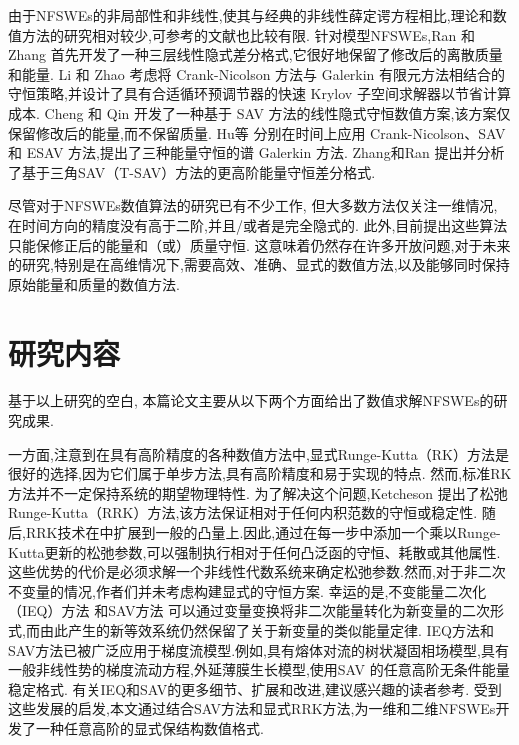 由于NFSWEs的非局部性和非线性,使其与经典的非线性薛定谔方程相比,理论和数值方法的研究相对较少,可参考的文献也比较有限.
针对模型NFSWEs,Ran 和 Zhang \cite{ranLinearlyImplicitConservative2016} 首先开发了一种三层线性隐式差分格式,它很好地保留了修改后的离散质量和能量. 
Li 和 Zhao \cite{liFastEnergyConserving2018} 考虑将 Crank-Nicolson 方法与 Galerkin 有限元方法相结合的守恒策略,并设计了具有合适循环预调节器的快速 Krylov 子空间求解器以节省计算成本. 
Cheng 和 Qin \cite{chengConvergenceEnergyconservingScheme2022} 开发了一种基于 SAV 方法的线性隐式守恒数值方案,该方案仅保留修改后的能量,而不保留质量.
Hu等 \cite{huEfficientEnergyPreserving2022} 分别在时间上应用 Crank-Nicolson、SAV 和 ESAV 方法,提出了三种能量守恒的谱 Galerkin 方法.
Zhang和Ran \cite{zhangHighorderStructurepreservingDifference2023} 提出并分析了基于三角SAV（T-SAV）方法的更高阶能量守恒差分格式.


尽管对于NFSWEs数值算法的研究已有不少工作, 但大多数方法仅关注一维情况, 在时间方向的精度没有高于二阶,并且/或者是完全隐式的.
此外,目前提出这些算法只能保修正后的能量和（或）质量守恒.
这意味着仍然存在许多开放问题,对于未来的研究,特别是在高维情况下,需要高效、准确、显式的数值方法,以及能够同时保持原始能量和质量的数值方法.

\section{研究内容}
基于以上研究的空白, 本篇论文主要从以下两个方面给出了数值求解NFSWEs的研究成果.

一方面,注意到在具有高阶精度的各种数值方法中,显式Runge-Kutta（RK）方法是很好的选择,因为它们属于单步方法,具有高阶精度和易于实现的特点.
然而,标准RK方法并不一定保持系统的期望物理特性.
为了解决这个问题,Ketcheson \cite{ketchesonRelaxationRungeKutta2019} 提出了松弛Runge-Kutta（RRK）方法,该方法保证相对于任何内积范数的守恒或稳定性.
随后,RRK技术在\cite{ranochaRelaxationRungeKutta2020}中扩展到一般的凸量上.因此,通过在每一步中添加一个乘以Runge-Kutta更新的松弛参数,可以强制执行相对于任何凸泛函的守恒、耗散或其他属性.
这些优势的代价是必须求解一个非线性代数系统来确定松弛参数.然而,对于非二次不变量的情况,作者们并未考虑构建显式的守恒方案.
幸运的是,不变能量二次化（IEQ）方法 \cite{yangLinearUnconditionallyEnergy2017, yangEfficientLinearSchemes2017} 和SAV方法 \cite{chengConvergenceEnergyconservingScheme2022} 可以通过变量变换将非二次能量转化为新变量的二次形式,而由此产生的新等效系统仍然保留了关于新变量的类似能量定律.
IEQ方法和SAV方法已被广泛应用于梯度流模型.例如,具有熔体对流\cite{chenEfficientNumericalScheme2019}的树状凝固相场模型,具有一般非线性势的梯度流动方程\cite{yangConvergenceAnalysisInvariant2020},外延薄膜生长模型\cite{chengHighlyEfficientAccurate2019},使用SAV \cite{gongArbitrarilyHighorderUnconditionally2019}的任意高阶无条件能量稳定格式.
有关IEQ和SAV的更多细节、扩展和改进,建议感兴趣的读者参考\cite{zhaoNumericalApproximationsPhase2017,shenScalarAuxiliaryVariable2018,liuExponentialScalarAuxiliary2020,chengMultipleScalarAuxiliary2018}.
受到这些发展的启发,本文通过结合SAV方法和显式RRK方法,为一维和二维NFSWEs开发了一种任意高阶的显式保结构数值格式.

